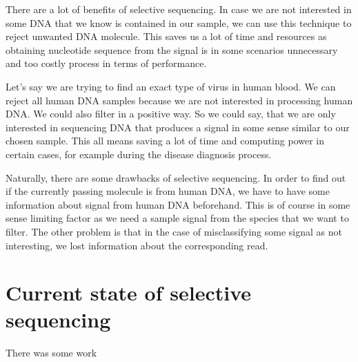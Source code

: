 There are a lot of benefits of selective sequencing. In case we are not interested
in some DNA that we know is contained in our sample, we can use this technique to
reject unwanted DNA molecule. This saves us a lot of time and resources as obtaining
nucleotide sequence from the signal is in some scenarios unnecessary and too
costly process in terms of performance.

Let's say we are trying to find an exact type of virus in human blood. We can
reject all human DNA samples because we are not interested in processing human
DNA. We could also filter in a positive way. So we could say, that we are only
interested in sequencing DNA that produces a signal in some sense similar to our
chosen sample. This all means saving a lot of time and computing power in certain
cases, for example during the disease diagnosis process.

Naturally, there are some drawbacks of selective sequencing. In order to find out
if the currently passing molecule is from human DNA, we have to have some information
about signal from human DNA beforehand.
This is of course in some sense limiting factor as we need a sample signal from
the species that we want to filter. The other problem is that in the case of misclassifying
some signal as not interesting, we lost information about the corresponding
read.

\section{Current state of selective sequencing}


There was some work
